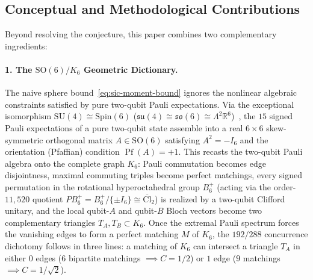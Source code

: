 \documentclass[11pt,a4paper]{article}
\theoremstyle{plain}
\theoremstyle{definition}
\theoremstyle{remark}
\newcommand{\R}{\mathbb{R}}
\newcommand{\Pf}{\operatorname{Pf}}
\newcommand{\SO}{\mathrm{SO}}
\newcommand{\SU}{\mathrm{SU}}
\newcommand{\Spin}{\mathrm{Spin}}
\newcommand{\PCl}{\overline{\mathrm{Cl}}}
\newcommand{\Bplus}{B_6^+}
\newcommand{\PBplus}{PB_6^+}
\begin{document}
\subsection{Conceptual and Methodological Contributions}

Beyond resolving the conjecture, this paper combines two complementary ingredients:

\paragraph{1. The $\SO(6)/K_6$ Geometric Dictionary.}
The naive sphere bound~\eqref{eq:sic-moment-bound} ignores the nonlinear algebraic constraints satisfied by pure two-qubit Pauli expectations. Via the exceptional isomorphism $\SU(4) \cong \Spin(6)$ ($\mathfrak{su}(4) \cong \mathfrak{so}(6) \cong \Lambda^2 \R^6$)~\cite{FultonHarris1991}, the $15$ signed Pauli expectations of a pure two-qubit state assemble into a real $6\times 6$ skew-symmetric orthogonal matrix $A \in \SO(6)$ satisfying $A^2 = -I_6$ and the orientation (Pfaffian) condition $\Pf(A) = +1$. This recasts the two-qubit Pauli algebra onto the complete graph $K_6$: Pauli commutation becomes edge disjointness, maximal commuting triples become perfect matchings, every signed permutation in the rotational hyperoctahedral group $\Bplus$ (acting via the order-$11{,}520$ quotient $\PBplus = \Bplus/\{\pm I_6\} \cong \PCl_2$) is realized by a two-qubit Clifford unitary, and the local qubit-$A$ and qubit-$B$ Bloch vectors become two complementary triangles $T_A, T_B \subset K_6$. Once the extremal Pauli spectrum forces the vanishing edges to form a perfect matching $M$ of $K_6$, the $192/288$ concurrence dichotomy follows in three lines: a matching of $K_6$ can intersect a triangle $T_A$ in either $0$ edges ($6$ bipartite matchings $\implies C = 1/2$) or $1$ edge ($9$ matchings $\implies C = 1/\sqrt{2}$).
\end{document}
